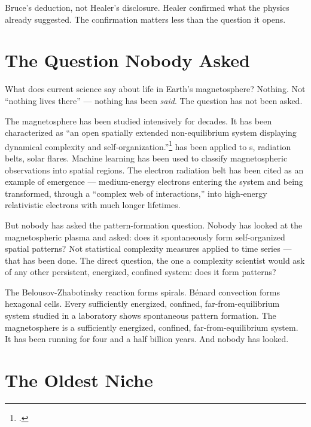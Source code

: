 Bruce's deduction, not Healer's disclosure. Healer confirmed what the physics already suggested. The confirmation matters less than the question it opens.


\section*{The Question Nobody Asked}
\label{pos32:the-question-nobody-asked}

What does current science say about life in Earth's magnetosphere? Nothing. Not ``nothing lives there'' --- nothing has been \textit{said}. The question has not been asked.

The magnetosphere has been studied intensively for decades. It has been characterized as ``an open spatially extended non-equilibrium system displaying dynamical complexity and self-organization.''\footcite{sharma2005}  has been applied to s, radiation belts, solar flares. Machine learning has been used to classify magnetospheric observations into spatial regions. The electron radiation belt has been cited as an example of emergence --- medium-energy electrons entering the system and being transformed, through a ``complex web of interactions,'' into high-energy relativistic electrons with much longer lifetimes.

But nobody has asked the pattern-formation question. Nobody has looked at the magnetospheric plasma and asked: does it spontaneously form self-organized spatial patterns? Not statistical complexity measures applied to time series --- that has been done. The direct question, the one a complexity scientist would ask of any other persistent, energized, confined system: does it form patterns?

The Belousov-Zhabotinsky reaction forms spirals. Bénard convection forms hexagonal cells. Every sufficiently energized, confined, far-from-equilibrium system studied in a laboratory shows spontaneous pattern formation. The magnetosphere is a sufficiently energized, confined, far-from-equilibrium system. It has been running for four and a half billion years. And nobody has looked.

\section*{The Oldest Niche}
\label{pos32:the-oldest-niche}

